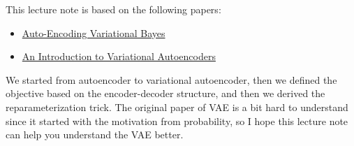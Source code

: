 \documentclass[11pt]{article}
\theoremstyle{definition}
\begin{document}
This lecture note is based on the following papers:

\begin{itemize}
    \item \href{https://arxiv.org/abs/1312.6114}{Auto-Encoding Variational Bayes}
    \item \href{https://arxiv.org/abs/1906.02691}{An Introduction to Variational Autoencoders}
\end{itemize}

We started from autoencoder to variational autoencoder, then we defined the objective based on the encoder-decoder structure, and then we derived the reparameterization trick. The original paper of VAE is a bit hard to understand since it started with the motivation from probability, so I hope this lecture note can help you understand the VAE better.
\end{document}
